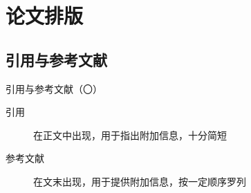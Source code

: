 \section{论文排版}

\subsection{引用与参考文献}

\begin{frame}[fragile]{引用与参考文献（〇）}
  \begin{description}
    \item[引用] 在正文中出现，用于指出附加信息，十分简短
    \item[参考文献] 在文末出现，用于提供附加信息，按一定顺序罗列
  \end{description}
\end{frame}

